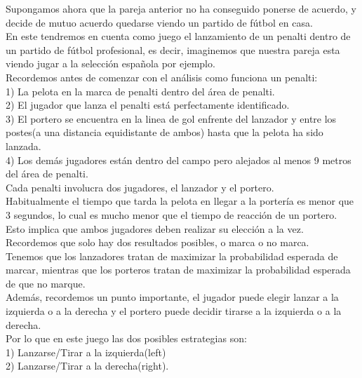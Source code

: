 \documentclass[10pt,a4paper]{book}
\begin{document}
Supongamos ahora que la pareja anterior no ha conseguido ponerse de acuerdo, y decide de mutuo acuerdo quedarse viendo un partido de fútbol en casa.\\ 

En este tendremos en cuenta como juego el lanzamiento de un penalti dentro de un partido de fútbol profesional, es decir, imaginemos que nuestra pareja esta viendo jugar a la selección española por ejemplo.\\

Recordemos antes de comenzar con el análisis como funciona un penalti:\\

1) La pelota en la marca de penalti dentro del área de penalti.\\
2) El jugador que lanza el penalti está perfectamente identificado.\\
3) El portero se encuentra en la linea de gol enfrente del lanzador y entre los postes(a una distancia equidistante de ambos) hasta que la pelota ha sido lanzada.\\
4) Los demás jugadores están dentro del campo pero alejados al menos 9 metros del área de penalti.\\


Cada penalti involucra dos jugadores, el lanzador y el portero.\\
Habitualmente el tiempo que tarda la pelota en llegar a la portería es menor que 3 segundos, lo cual es mucho menor que el tiempo de reacción de un portero. Esto implica que ambos jugadores deben realizar su elección a la vez.\\

Recordemos que solo hay dos resultados posibles, o marca o no marca.\\


Tenemos que los lanzadores tratan de maximizar la probabilidad esperada de marcar, mientras que los porteros tratan de maximizar la probabilidad esperada de que no marque.\\

Además, recordemos un punto importante, el jugador puede elegir lanzar a la izquierda o a la derecha y el portero puede decidir tirarse a la izquierda o a la derecha.\\

Por lo que en este juego las dos posibles estrategias son:\\
1) Lanzarse/Tirar a la izquierda(left)\\
2) Lanzarse/Tirar a la derecha(right).\\
\end{document}
